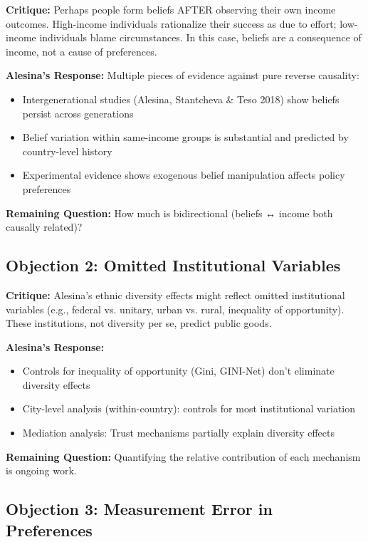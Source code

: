 \textbf{Critique:} Perhaps people form beliefs AFTER observing their own income outcomes. High-income individuals rationalize their success as due to effort; low-income individuals blame circumstances. In this case, beliefs are a consequence of income, not a cause of preferences.

\textbf{Alesina's Response:} Multiple pieces of evidence against pure reverse causality:
\begin{itemize}
\item Intergenerational studies (Alesina, Stantcheva \& Teso 2018) show beliefs persist across generations
\item Belief variation within same-income groups is substantial and predicted by country-level history
\item Experimental evidence shows exogenous belief manipulation affects policy preferences
\end{itemize}

\textbf{Remaining Question:} How much is bidirectional (beliefs ↔ income both causally related)?

\subsection{Objection 2: Omitted Institutional Variables}

\textbf{Critique:} Alesina's ethnic diversity effects might reflect omitted institutional variables (e.g., federal vs. unitary, urban vs. rural, inequality of opportunity). These institutions, not diversity per se, predict public goods.

\textbf{Alesina's Response:}
\begin{itemize}
\item Controls for inequality of opportunity (Gini, GINI-Net) don't eliminate diversity effects
\item City-level analysis (within-country): controls for most institutional variation
\item Mediation analysis: Trust mechanisms partially explain diversity effects
\end{itemize}

\textbf{Remaining Question:} Quantifying the relative contribution of each mechanism is ongoing work.

\subsection{Objection 3: Measurement Error in Preferences}

